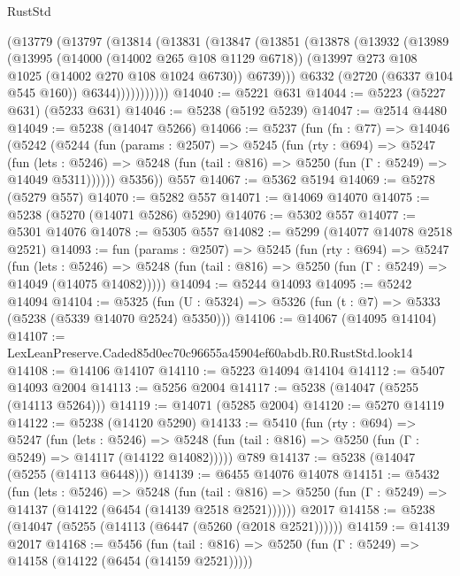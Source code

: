 \begin{lexlean}{RustStd}
\begin{coremodule}
            (@13779
              (@13797
                (@13814
                  (@13831
                    (@13847
                      (@13851
                        (@13878
                          (@13932
                            (@13989
                              (@13995
                                (@14000 (@14002 @265 @108 @1129 @6718))
                                (@13997 @273 @108 @1025 (@14002 @270 @108 @1024 @6730))
                                @6739)))
                          @6332
                          (@2720 (@6337 @104 @545 @160))
                          @6344)))))))))))
@14040 := @5221 @631
@14044 := @5223 (@5227 @631) (@5233 @631)
@14046 := @5238 (@5192 @5239)
@14047 := @2514 @4480
@14049 := @5238 (@14047 @5266)
@14066 := @5237
    (fun (fn : @77) =>
    @14046
      (@5242
        (@5244
          (fun (params : @2507) =>
          @5245
            (fun (rty : @694) =>
            @5247
              (fun (lets : @5246) =>
              @5248 (fun (tail : @816) => @5250 (fun (Γ : @5249) => @14049 @5311))))))
        @5356))
    @557
@14067 := @5362 @5194
@14069 := @5278 (@5279 @557)
@14070 := @5282 @557
@14071 := @14069 @14070
@14075 := @5238 (@5270 (@14071 @5286) @5290)
@14076 := @5302 @557
@14077 := @5301 @14076
@14078 := @5305 @557
@14082 := @5299 (@14077 @14078 @2518 @2521)
@14093 := fun (params : @2507) =>
  @5245
    (fun (rty : @694) =>
    @5247
      (fun (lets : @5246) =>
      @5248 (fun (tail : @816) => @5250 (fun (Γ : @5249) => @14049 (@14075 @14082)))))
@14094 := @5244 @14093
@14095 := @5242 @14094
@14104 := @5325
    (fun (U : @5324) => @5326 (fun (t : @7) => @5333 (@5238 (@5339 @14070 @2524) @5350)))
@14106 := @14067 (@14095 @14104)
@14107 := LexLeanPreserve.Caded85d0ec70c96655a45904ef60abdb.R0.RustStd.look14
@14108 := @14106 @14107
@14110 := @5223 @14094 @14104
@14112 := @5407 @14093 @2004
@14113 := @5256 @2004
@14117 := @5238 (@14047 (@5255 (@14113 @5264)))
@14119 := @14071 (@5285 @2004)
@14120 := @5270 @14119
@14122 := @5238 (@14120 @5290)
@14133 := @5410
    (fun (rty : @694) =>
    @5247
      (fun (lets : @5246) =>
      @5248 (fun (tail : @816) => @5250 (fun (Γ : @5249) => @14117 (@14122 @14082)))))
    @789
@14137 := @5238 (@14047 (@5255 (@14113 @6448)))
@14139 := @6455 @14076 @14078
@14151 := @5432
    (fun (lets : @5246) =>
    @5248
      (fun (tail : @816) =>
      @5250 (fun (Γ : @5249) => @14137 (@14122 (@6454 (@14139 @2518 @2521))))))
    @2017
@14158 := @5238 (@14047 (@5255 (@14113 (@6447 (@5260 (@2018 @2521))))))
@14159 := @14139 @2017
@14168 := @5456
    (fun (tail : @816) => @5250 (fun (Γ : @5249) => @14158 (@14122 (@6454 (@14159 @2521)))))

\end{coremodule}
\end{lexlean}
